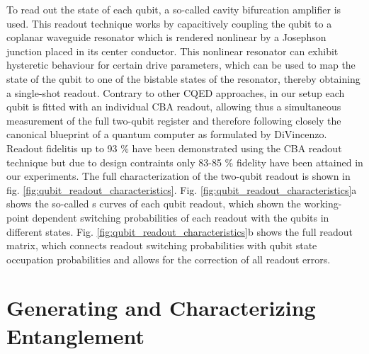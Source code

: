 To read out the state of each qubit, a so-called cavity bifurcation amplifier \citep{siddiqi_dispersive_2006,mallet_single-shot_2009} is used. This readout technique works by capacitively coupling the qubit to a coplanar waveguide resonator which is rendered nonlinear by a Josephson junction placed in its center conductor. This nonlinear resonator can exhibit hysteretic behaviour for certain drive parameters, which can be used to map the state of the qubit to one of the bistable states of the resonator, thereby obtaining a single-shot readout. Contrary to other CQED approaches, in our setup each qubit is fitted with an individual CBA readout, allowing thus a simultaneous measurement of the full two-qubit register and therefore following closely the canonical blueprint of a quantum computer as formulated by DiVincenzo. Readout fidelitis up to 93 \% have been demonstrated using the CBA readout technique \citep{mallet_single-shot_2009} but due to design contraints only  83-85 \% fidelity have been attained in our experiments. The full characterization of the two-qubit readout is shown in fig. \ref{fig:qubit_readout_characteristics}. Fig. \ref{fig:qubit_readout_characteristics}a shows the so-called s curves of each qubit readout, which shown the working-point dependent switching probabilities of each readout with the qubits in different states. Fig. \ref{fig:qubit_readout_characteristics}b shows the full readout matrix, which connects readout switching probabilities with qubit state occupation probabilities and allows for the correction of all readout errors.

\section{Generating and Characterizing Entanglement}


